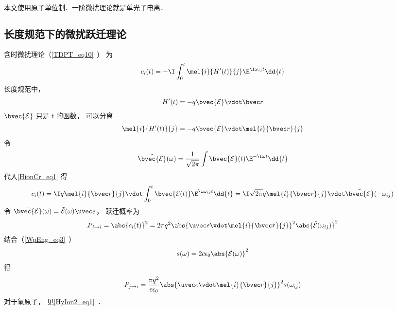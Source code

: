 
\begin{issues}
\issueDraft
\end{issues}


本文使用原子单位制．一阶微扰理论就是单光子电离．

\subsection{长度规范下的微扰跃迁理论}
含时微扰理论（\autoref{TDPT_eq10}~） 为
\begin{equation}\label{HionCr_eq1}
c_i(t) = -\I \int_0^t \mel{i}{H'(t)}{j} \E^{\I\omega_{ij} t} \dd{t}
\end{equation}
长度规范中，
\begin{equation}
H'(t) = -q\bvec {\mathcal E} \vdot \bvec r
\end{equation}
$\bvec {\mathcal E}$ 只是 $t$ 的函数， 可以分离
\begin{equation}
\mel{i}{H'(t)}{j} = -q\bvec {\mathcal E} \vdot \mel{i}{\bvec r}{j}
\end{equation}
令
\begin{equation}
\tilde {\bvec {\mathcal E}}(\omega) = \frac{1}{\sqrt{2\pi}} \int \bvec {\mathcal E}(t) \E^{-\I\omega t} \dd{t}
\end{equation}
代入\autoref{HionCr_eq1} 得
\begin{equation}\label{HionCr_eq7}
c_i(t) = \I q \mel{i}{\bvec r}{j} \vdot \int_0^t \bvec {\mathcal E(t)} \E^{\I\omega_{ij} t} \dd{t} = \I \sqrt{2\pi} q \mel{i}{\bvec r}{j} \vdot \tilde {\bvec {\mathcal E}}(-\omega_{ij})
\end{equation}
令 $\tilde {\bvec {\mathcal E}}(\omega) = \tilde {{\mathcal E}}(\omega)\uvec e$， 跃迁概率为
\begin{equation}\label{HionCr_eq2}
P_{j\to i} = \abs{c_i(t)}^2 = 2\pi q^2 \abs{\uvec e \vdot \mel{i}{\bvec r}{j}}^2 \abs{\tilde {{\mathcal E}}(\omega_{ij})}^2
\end{equation}
结合（\autoref{WpEng_eq3}~）
\begin{equation}
s(\omega) = 2c\epsilon_0 \abs{\tilde {{\mathcal E}}(\omega)}^2
\end{equation}
得
\begin{equation}\label{HionCr_eq6}
P_{j\to i} = \frac{\pi q^2}{c\epsilon_0} \abs{\uvec e \vdot\mel{i}{\bvec r}{j}}^2 s(\omega_{ij})
\end{equation}
对于氢原子， 见\autoref{HyIon2_eq1}~．

